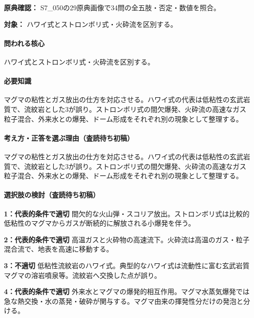 \noindent\textbf{原典確認：} S7\_050の29原典画像で34問の全五肢・否定・数値を照合。\par

\noindent\textbf{対象：} ハワイ式とストロンボリ式・火砕流を区別する。\par

\paragraph{問われる核心} ハワイ式とストロンボリ式・火砕流を区別する。

\paragraph{必要知識} マグマの粘性とガス放出の仕方を対応させる。ハワイ式の代表は低粘性の玄武岩質で、流紋岩とした3が誤り。ストロンボリ式の間欠爆発、火砕流の高速なガス粒子混合、外来水との爆発、ドーム形成をそれぞれ別の現象として整理する。

\paragraph{考え方・正答を選ぶ理由（査読待ち初稿）} マグマの粘性とガス放出の仕方を対応させる。ハワイ式の代表は低粘性の玄武岩質で、流紋岩とした3が誤り。ストロンボリ式の間欠爆発、火砕流の高速なガス粒子混合、外来水との爆発、ドーム形成をそれぞれ別の現象として整理する。

\paragraph{選択肢の検討（査読待ち初稿）}\mbox{}\par

\noindent\textbf{1：代表的条件で適切} 間欠的な火山弾・スコリア放出。ストロンボリ式は比較的低粘性のマグマからガスが断続的に解放される小爆発を伴う。\par

\noindent\textbf{2：代表的条件で適切} 高温ガスと火砕物の高速流下。火砕流は高温のガス・粒子混合流で、地表を高速に移動する。\par

\noindent\textbf{3：不適切} 低粘性流紋岩のハワイ式。典型的なハワイ式は流動性に富む玄武岩質マグマの溶岩噴泉等。流紋岩へ交換した点が誤り。\par

\noindent\textbf{4：代表的条件で適切} 外来水とマグマの爆発的相互作用。マグマ水蒸気爆発では急な熱交換・水の蒸発・破砕が関与する。マグマ由来の揮発性分だけの発泡と分ける。\par

